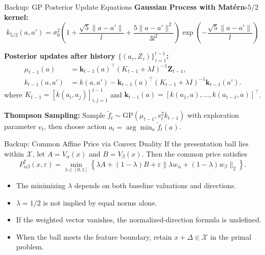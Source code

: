 \documentclass[aspectratio=169, 11pt, t, xcolor=table]{beamer}
\begin{document}
\begin{frame}{Backup: GP Posterior Update Equations}
\small
\textbf{Gaussian Process with Mat\'ern-$5/2$ kernel:}
\[
  k_{5/2}(a, a') = \sigma_0^2\left(1 + \frac{\sqrt{5}\|a-a'\|}{l} + \frac{5\|a-a'\|^2}{3l^2}\right)\exp\!\left(-\frac{\sqrt{5}\|a-a'\|}{l}\right)
\]

\textbf{Posterior updates after history $\{(a_\tau, Z_\tau)\}_{\tau=1}^{t-1}$:}
\begin{align*}
  \mu_{t-1}(a) &= \mathbf{k}_{t-1}(a)^\top (K_{t-1} + \lambda I)^{-1} \mathbf{Z}_{t-1}, \\
  k_{t-1}(a, a') &= k(a,a') - \mathbf{k}_{t-1}(a)^\top (K_{t-1} + \lambda I)^{-1} \mathbf{k}_{t-1}(a').
\end{align*}
where $K_{t-1} = [k(a_i, a_j)]_{i,j=1}^{t-1}$ and $\mathbf{k}_{t-1}(a) = [k(a_1, a), \ldots, k(a_{t-1}, a)]^\top$.

\par\vspace{0.4em}
\textbf{Thompson Sampling:} Sample $\widetilde{f}_t \sim \text{GP}(\mu_{t-1}, v_t^2 k_{t-1})$ with exploration parameter $v_t$, then choose action $a_t = \arg\min_{a}\widetilde{f}_t(a)$.
\end{frame}

\begin{frame}{Backup: Common Affine Price via Convex Duality}
\small
If the presentation ball lies within $\mathcal X$, let $A=V_\alpha(x)$ and $B=V_\beta(x)$.
Then the common price satisfies
\[
P_{\alpha\beta}^*(x,\varepsilon)=\min_{\lambda\in[0,1]}
\left\{\lambda A+(1-\lambda)B+
\varepsilon\|\lambda w_\alpha+(1-\lambda)w_\beta\|_2\right\}.
\]
\begin{itemize}
\item The minimizing $\lambda$ depends on both baseline valuations and directions.
\item $\lambda=1/2$ is not implied by equal norms alone.
\item If the weighted vector vanishes, the normalized-direction formula is undefined.
\item When the ball meets the feature boundary, retain $x+\Delta\in\mathcal X$
in the primal problem.
\end{itemize}
\end{frame}

\end{document}
